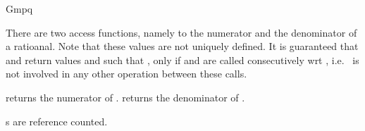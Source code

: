 \begin{ccRefClass} {Gmpq}
\ccOperations

There are two access functions, namely to the
numerator and the denominator of a ratioanal.
Note that these values are not uniquely defined. 
It is guaranteed that  and 
 return values  and
 such that , only
if   and  are called
consecutively wrt , i.e.~ is not involved in 
any other operation between these calls.


       {returns the numerator of .}
\ccGlue
{}
       {returns the denominator of .}

\ccImplementation
{}s are reference counted.

\end{ccRefClass} 
